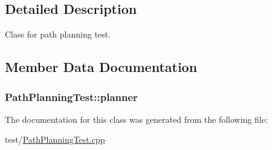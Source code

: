 \subsection{Detailed Description}
Class for path planning test. 

\subsection{Member Data Documentation}
\subsubsection[{\texorpdfstring{planner}{planner}}]{ Path\+Planning\+Test\+::planner\hspace{0.3cm}{\ttfamily [protected]}}\hypertarget{class_path_planning_test_af307c6073040bffa9d602969d81ae254}{}\label{class_path_planning_test_af307c6073040bffa9d602969d81ae254}


The documentation for this class was generated from the following file\+:\begin{DoxyCompactItemize}
\item 
test/\hyperlink{_path_planning_test_8cpp}{Path\+Planning\+Test.\+cpp}\end{DoxyCompactItemize}
